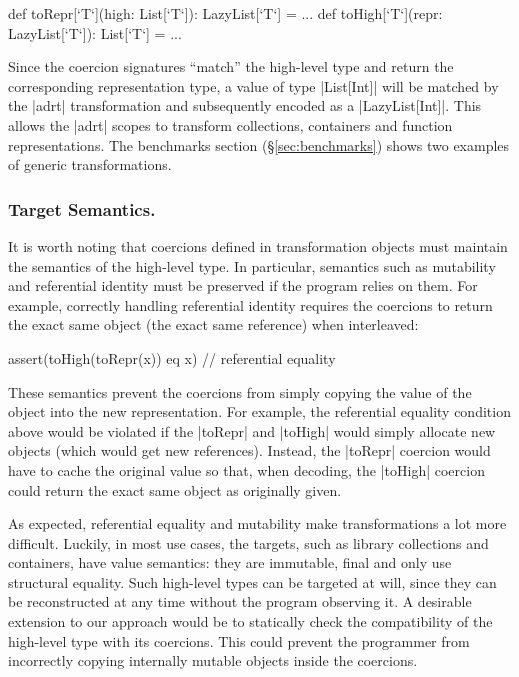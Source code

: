 \begin{lstlisting-nobreak}
  def toRepr[`T`](high: List[`T`]): LazyList[`T`] = ...
  def toHigh[`T`](repr: LazyList[`T`]): List[`T`] = ...
\end{lstlisting-nobreak}

Since the coercion signatures ``match'' the high-level type and return the corresponding representation type, a value of type |List[Int]| will be matched by the |adrt| transformation and subsequently encoded as a |LazyList[Int]|. This allows the |adrt| scopes to transform collections, containers and function representations. The benchmarks section (\S\ref{sec:benchmarks}) shows two examples of generic transformations.

\subsubsection{Target Semantics.} It is worth noting that coercions defined in transformation objects must maintain the semantics of the high-level type. In particular, semantics such as mutability and referential identity must be preserved if the program relies on them. For example, correctly handling referential identity requires the coercions to return the exact same object (the exact same reference) when interleaved:

\begin{lstlisting-nobreak}
assert(toHigh(toRepr(x)) eq x) // referential equality
\end{lstlisting-nobreak}

These semantics prevent the coercions from simply copying the value of the object into the new representation.
For example, the referential equality condition above would be violated if the |toRepr| and |toHigh| would simply allocate new objects (which would get new references). Instead, the |toRepr| coercion would have to cache the original value so that, when decoding, the |toHigh| coercion could return the exact same object as originally given.

As expected, referential equality and mutability make transformations a lot more difficult. Luckily, in most use cases, the targets, such as library collections and containers, have value semantics: they are immutable, final and only use structural equality. Such high-level types can be targeted at will, since they can be reconstructed at any time without the program observing it. A desirable extension to our approach would be to statically check the compatibility of the high-level type with its coercions. This could prevent the programmer from incorrectly copying internally mutable objects inside the coercions.


